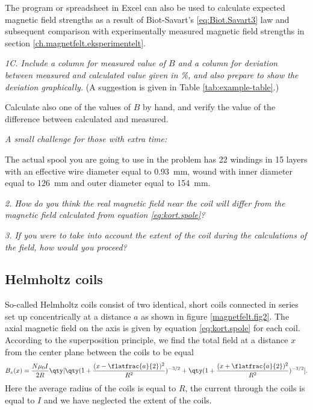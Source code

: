 \documentclass[../Elmag-labhefte-2020.tex]{subfiles}
\begin{document}
The program or spreadsheet in Excel can also be used to calculate expected magnetic field strengths as a result of Biot-Savart's \eqref{eq:Biot.Savart3} law and subsequent comparison with experimentally measured magnetic field strengths in section \ref{ch.magnetfelt.eksperimentelt}.

\emph{ 1C. Include a column for measured value of $B$ and a column for deviation between measured and calculated value given in \si{\percent}, and also prepare to show the deviation graphically.} (A suggestion is given in Table \ref{tab:example-table}.)

Calculate also one of the values of $B$ by hand, and verify the value of the difference between calculated and measured.

\vspace{4mm}

\emph{A small challenge for those with extra time:}

The actual spool you are going to use in the problem has 22 windings in 15 layers with an effective wire diameter equal to \SI{0.93}{\mm}, wound with inner diameter equal to \SI{126}{\mm} and outer diameter equal to \SI{154}{\mm}.

\emph{ 2. How do you think the real magnetic field near the coil will differ from the magnetic field calculated from equation \eqref{eq:kort.spole}?}

\emph{ 3. If you were to take into account the extent of the coil during the calculations of the field, how would you proceed?} 

\subsection{Helmholtz coils}

So-called Helmholtz coils
consist of two identical, short coils connected in series set up concentrically at a distance $a$ as shown in figure \ref{magnetfelt.fig2}. The axial magnetic field on the axis is given by equation \eqref{eq:kort.spole} for each coil. According to the superposition principle, we find the total field at a distance $x$ from the center plane between the coils to be equal
%
\begin{equation}
    B_x (x) 
        = \frac{N \mu_0 I}{2 R} \qty[\qty(1 + \frac{(x - \flatfrac{a}{2})^2}{R^2})^{-3/2} 
            + \qty(1 + \frac{(x + \flatfrac{a}{2})^2}{R^2})^{-3/2}].
    \label{eq:Helmholtz}
\end{equation}
%
Here the average radius of the coils is equal to $R$, the current through the coils is equal to $I$ and we have neglected the extent of the coils.
\end{document}
